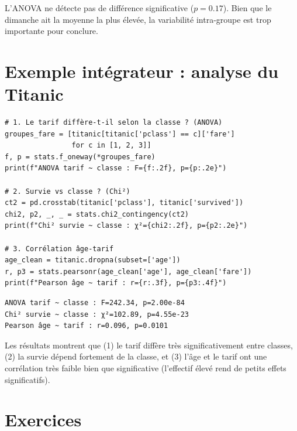 \begin{remarque}
L'ANOVA ne d\'etecte pas de diff\'erence significative ($p = 0.17$). Bien que le dimanche ait la moyenne la plus \'elev\'ee, la variabilit\'e intra-groupe est trop importante pour conclure.
\end{remarque}

\section{Exemple int\'egrateur : analyse du Titanic}

\begin{codeblock}[title=\textbf{Python}]
\begin{verbatim}
# 1. Le tarif diffère-t-il selon la classe ? (ANOVA)
groupes_fare = [titanic[titanic['pclass'] == c]['fare']
                for c in [1, 2, 3]]
f, p = stats.f_oneway(*groupes_fare)
print(f"ANOVA tarif ~ classe : F={f:.2f}, p={p:.2e}")

# 2. Survie vs classe ? (Chi²)
ct2 = pd.crosstab(titanic['pclass'], titanic['survived'])
chi2, p2, _, _ = stats.chi2_contingency(ct2)
print(f"Chi² survie ~ classe : χ²={chi2:.2f}, p={p2:.2e}")

# 3. Corrélation âge-tarif
age_clean = titanic.dropna(subset=['age'])
r, p3 = stats.pearsonr(age_clean['age'], age_clean['fare'])
print(f"Pearson âge ~ tarif : r={r:.3f}, p={p3:.4f}")
\end{verbatim}
\end{codeblock}

\begin{codeoutput}
\begin{verbatim}
ANOVA tarif ~ classe : F=242.34, p=2.00e-84
Chi² survie ~ classe : χ²=102.89, p=4.55e-23
Pearson âge ~ tarif : r=0.096, p=0.0101
\end{verbatim}
\end{codeoutput}

\begin{proposition}
Les r\'esultats montrent que (1) le tarif diff\`ere tr\`es significativement entre classes, (2) la survie d\'epend fortement de la classe, et (3) l'\^age et le tarif ont une corr\'elation tr\`es faible bien que significative (l'effectif \'elev\'e rend de petits effets significatifs).
\end{proposition}

\section{Exercices}

